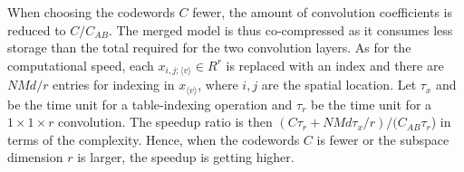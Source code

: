 \documentclass{article}
\begin{document}
	
	When choosing the codewords $C$ fewer, the amount of convolution coefficients is reduced to $C/C_{AB}$.
	The merged model is thus co-compressed as it consumes less storage than the total required for the two convolution layers.
	As for the computational speed, each $x_{i,j;\langle v\rangle}\in R^r$ is replaced with an index and there are $NMd/r$ entries for indexing in $x_{\langle v \rangle}$, where $i,j$ are the spatial location.
	Let $\tau_x$ and be the time unit for a table-indexing operation and $\tau_r$ be the time unit for a $1\times 1\times r$ convolution.
	The speedup ratio is then $(C\tau_r+NMd\tau_x/r)/(C_{AB}\tau_r$) in terms of the complexity.
	Hence, when the codewords $C$ is fewer or the subspace dimension $r$ is larger, the speedup is getting higher.
	
	
	
	
\end{document}
